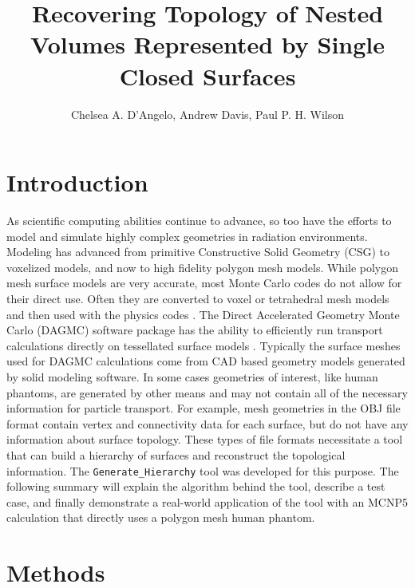 \documentclass{anstrans}
\title{Recovering Topology of Nested Volumes Represented by Single Closed Surfaces}
\author{Chelsea A. D'Angelo, Andrew Davis, Paul P. H. Wilson}
\institute{
Computational Nuclear Engineering Research Group, University of Wisconsin-Madison, Madison WI}
\begin{document}
\section{Introduction}
As scientific computing abilities continue to advance, so too have the efforts to model
and simulate highly complex geometries in radiation environments.  Modeling has
advanced from primitive Constructive Solid Geometry (CSG) to voxelized models, and now to high fidelity polygon mesh 
models.  While polygon mesh surface models are very accurate, most Monte Carlo codes
do not allow for their direct use. Often they are converted to voxel or tetrahedral 
mesh models and then used with the physics codes \cite{tetmesh}.
The Direct Accelerated Geometry Monte Carlo (DAGMC) software package
has the ability to efficiently run transport calculations directly on tessellated
surface models \cite{dagmc}.  Typically the surface meshes used for DAGMC 
calculations come from CAD based geometry models generated by solid modeling software.
In some cases geometries of interest, like human phantoms, are generated by other 
means and may not contain all of the necessary information for particle transport. 
For example, mesh geometries in the OBJ file format contain vertex and connectivity
data for each surface, but do not have any information about surface topology.  
These types of file formats necessitate a tool that can build a hierarchy of 
surfaces and reconstruct the topological information.  The \texttt{Generate\_Hierarchy} 
tool was developed for this purpose.  The following summary will explain the algorithm
behind the tool, describe a test case, and finally demonstrate a real-world application
of the tool with an MCNP5 calculation that directly uses a polygon mesh human phantom.
\section{Methods}
\end{document}
